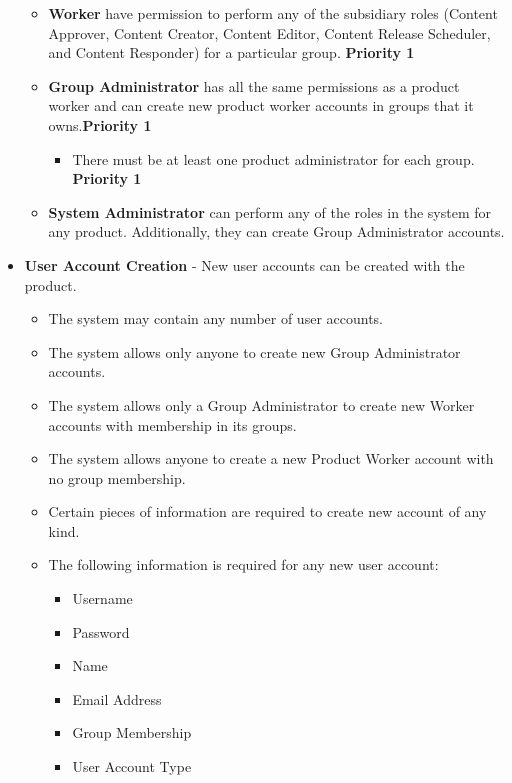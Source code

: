 \documentclass{report}
\begin{document}
\begin{itemize}
\begin{itemize}
					\item \textbf{Worker} have permission to perform any 
					of the subsidiary roles (Content Approver, Content Creator, 
						Content Editor, Content Release Scheduler, and Content 
						Responder) for a particular group.  \textbf{Priority 1}
					
					\item \textbf{Group Administrator} has all the same 
					permissions as a product worker and can create new product
					worker accounts in groups that it owns.\textbf{Priority 1}  
					
					\begin{itemize}
						\item There must be at least one product administrator 
						for each group. \textbf{Priority 1}
					\end{itemize}

					\item \textbf{System Administrator} can perform any of the roles in the system for any product.
					Additionally, they can create Group Administrator 
				accounts.
				\end{itemize}

				\item \textbf{User Account Creation} - New user accounts can be 
				created with the product.
					\begin{itemize}
						\item The system may contain any number of user 
						accounts.
						\item The system allows only anyone to create new 
						Group Administrator accounts.
						\item The system allows only a Group Administrator to 
						create new Worker accounts with membership in 
						its groups.
						\item The system allows anyone to create a new Product 
						Worker account with no group membership.
						\item Certain pieces of information are required to 
						create new account of any kind.
						\item The following information is required for any new 
						user account:
							\begin{itemize}
								\item Username
								\item Password
								\item Name
								\item Email Address
								\item Group Membership
								\item User Account Type
							\end{itemize}	
				

\end{itemize}
\end{itemize}
\end{document}

